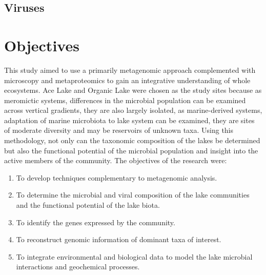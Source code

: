 \subsection{Viruses}


\section{Objectives}
This study aimed to use a primarily metagenomic approach complemented with microscopy and metaproteomics to gain an integrative understanding of whole ecosystems.
Ace Lake and Organic Lake were chosen as the study sites because as meromictic systems, differences in the microbial population can be examined across vertical gradients, they are also largely isolated, as marine-derived systems, adaptation of marine microbiota to lake system can be examined, they are sites of moderate diversity and may be reservoirs of unknown taxa.
Using this methodology, not only can the taxonomic composition of the lakes be determined but also the functional potential of the microbial population and insight into the active members of the community.
The objectives of the research were:

\begin{enumerate}
\item 
  To develop techniques complementary to metagenomic analysis.

\item
  To determine the microbial and viral composition of the lake communities and the functional potential of the lake biota.

\item
  To identify the genes expressed by the community.

\item
  To reconstruct genomic information of dominant taxa of interest.

\item
  To integrate environmental and biological data to model the lake microbial interactions and geochemical processes.

\end{enumerate}
